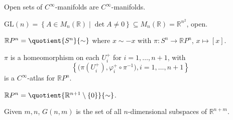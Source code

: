 \begin{eg}
	Open sets of \(C^{\infty} \)-manifolds are \(C^{\infty}\)-manifolds.
\end{eg}

\begin{eg}
	\(\mathrm{GL} (n) = \left\{ A\in M_n(\mathbb{R} ) \mid \det A \neq 0 \right\} \subseteq M_n(\mathbb{R} ) = \mathbb{R} ^{n^2}\), open.
\end{eg}

\begin{eg}
	\(\mathbb{R} P^n = \quotient{S^n}{\sim } \) where \(x \sim -x\) with \(\pi \colon S^n \to \mathbb{R} P^n\), \(x \mapsto [x]\).
\end{eg}
\begin{explanation}
	\(\pi \) is a homeomorphism on each \(U_i^+\) for \(i=1, \ldots , n+1\), with
	\[
		\left\{ \big( \pi (U_i^+), \varphi _i^+ \circ \pi ^{-1}  \big), i=1, \ldots , n+1 \right\}
	\]
	is a \(C^{\infty} \)-atlas for \(\mathbb{R} P^n\).
\end{explanation}

\begin{note}
	\(\mathbb{R} P^n = \quotient{\mathbb{R} ^{n+1} \setminus \left\{ 0 \right\} }{\sim } \).
\end{note}

\begin{eg}
	Given \(m, n\), \(G(n, m)\) is the set of all \(n\)-dimensional subspaces of \(\mathbb{R} ^{n+m}\).
\end{eg}